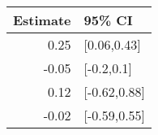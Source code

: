 \begin{tabular}{rl}
  \hline
Estimate & 95\% CI \\ 
  \hline
0.25 & [0.06,0.43] \\ 
  -0.05 & [-0.2,0.1] \\ 
  0.12 & [-0.62,0.88] \\ 
  -0.02 & [-0.59,0.55] \\ 
   \hline
\end{tabular}

